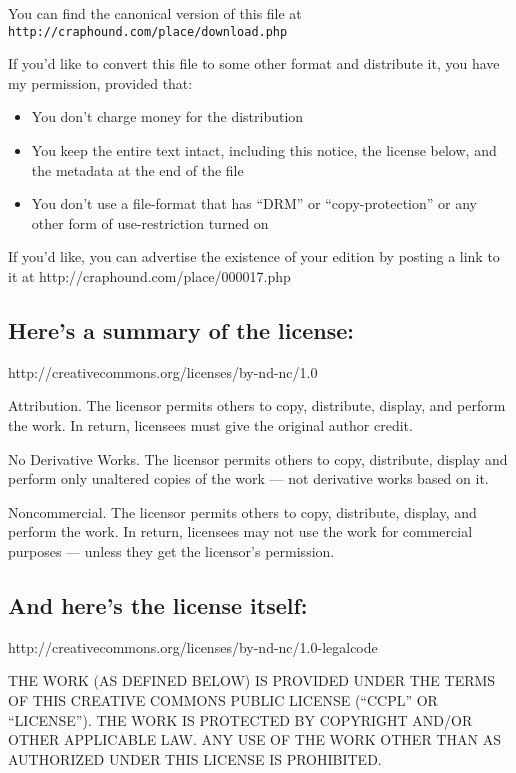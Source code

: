 You can find the canonical version of this file at\\
\texttt{http://craphound.com/place/download.php}

If you'd like to convert this file to some other format and
distribute it, you have my permission, provided that:

\begin{itemize}
\item
  You don't charge money for the distribution

\item
  You keep the entire text intact, including this notice, the license
  below, and the metadata at the end of the file

\item
  You don't use a file-format that has ``DRM'' or ``copy-protection''
  or any other form of use-restriction turned on

\end{itemize}
If you'd like, you can advertise the existence of your edition by
posting a link to it at http://craphound.com/place/000017.php


\subsection{Here's a summary of the license:}

http://creativecommons.org/licenses/by-nd-nc/1.0

Attribution. The licensor permits others to copy, distribute,
display, and perform the work. In return, licensees must give the
original author credit.

No Derivative Works. The licensor permits others to copy,
distribute, display and perform only unaltered copies of the work
--- not derivative works based on it.

Noncommercial. The licensor permits others to copy, distribute,
display, and perform the work. In return, licensees may not use the
work for commercial purposes --- unless they get the licensor's
permission.

\subsection{And here's the license itself:}

http://creativecommons.org/licenses/by-nd-nc/1.0-legalcode

THE WORK (AS DEFINED BELOW) IS PROVIDED UNDER THE TERMS OF THIS
CREATIVE COMMONS PUBLIC LICENSE (``CCPL'' OR ``LICENSE''). THE WORK
IS PROTECTED BY COPYRIGHT AND/OR OTHER APPLICABLE LAW. ANY USE OF
THE WORK OTHER THAN AS AUTHORIZED UNDER THIS LICENSE IS
PROHIBITED.

